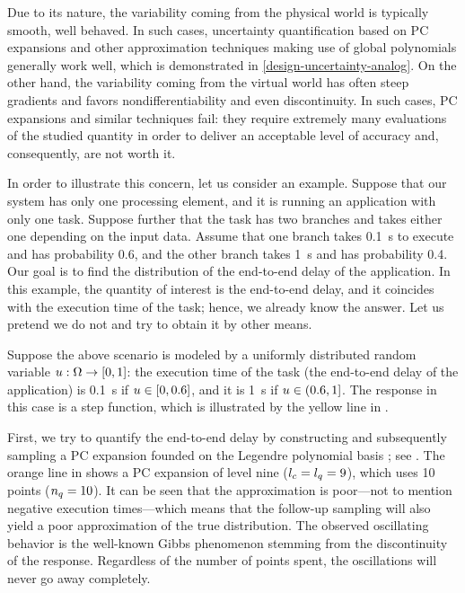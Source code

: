 Due to its nature, the variability coming from the physical world is typically
smooth, well behaved. In such cases, uncertainty quantification based on
\acf{PC} expansions \cite{xiu2010} and other approximation techniques making use
of global polynomials generally work well, which is demonstrated in
\cref{design-uncertainty-analog}. On the other hand, the variability coming from
the virtual world has often steep gradients and favors nondifferentiability and
even discontinuity. In such cases, \ac{PC} expansions and similar techniques
fail: they require extremely many evaluations of the studied quantity in order
to deliver an acceptable level of accuracy and, consequently, are not worth it.

In order to illustrate this concern, let us consider an example. Suppose that
our system has only one processing element, and it is running an application
with only one task. Suppose further that the task has two branches and takes
either one depending on the input data. Assume that one branch takes 0.1~s to
execute and has probability 0.6, and the other branch takes 1~s and has
probability 0.4. Our goal is to find the distribution of the end-to-end delay of
the application. In this example, the quantity of interest is the end-to-end
delay, and it coincides with the execution time of the task; hence, we already
know the answer. Let us pretend we do not and try to obtain it by other means.

Suppose the above scenario is modeled by a uniformly distributed random variable
$u: \Omega \to [0, 1]$: the execution time of the task (the end-to-end delay of
the application) is 0.1~s if $u \in [0, 0.6]$, and it is 1~s if $u \in (0.6,
1]$. The response in this case is a step function, which is illustrated by the
yellow line in .

First, we try to quantify the end-to-end delay by constructing and subsequently
sampling a \ac{PC} expansion founded on the Legendre polynomial basis
\cite{xiu2010}; see . The orange line in
 shows a \ac{PC} expansion of level nine (${l_{c}} = {l_{q}} =
9$), which uses 10 points (${n_{q}} = 10$). It can be seen that the approximation is
poor---not to mention negative execution times---which means that the follow-up
sampling will also yield a poor approximation of the true distribution. The
observed oscillating behavior is the well-known Gibbs phenomenon stemming from
the discontinuity of the response. Regardless of the number of points spent, the
oscillations will never go away completely.


